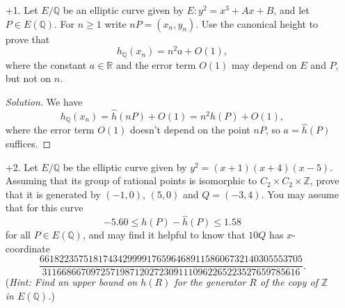 \documentclass[a4paper]{article}
\theoremstyle{plain}
\theoremstyle{remark}
\theoremstyle{definition}
\newcommand{\Z}{\mathbb{Z}}
\newcommand{\Q}{\mathbb{Q}}
\newcommand{\R}{\mathbb{R}}
\begin{document}
\begin{enumerate}
    \item[+1.] Let $E/\Q$ be an elliptic curve given by $E:y^2=x^3+Ax+B$, and
        let $P\in E(\Q)$. For $n\ge1$ write $nP=(x_n,y_n)$. Use the canonical
        height to prove that
        \begin{equation*}
            h_\Q(x_n) = n^2a+O(1),
        \end{equation*}
        where the constant $a\in\R$ and the error term $O(1)$ may depend on $E$
        and $P$, but not on $n$.

        \begin{proof}[Solution]
            We have
            \begin{equation*}
                h_\Q(x_n)
                    = \hat h(nP) + O(1)
                    = n^2\hat h(P) + O(1),
            \end{equation*}
            where the error term $O(1)$ doesn't depend on the point $nP$, so
            $a=\hat h(P)$ suffices.
        \end{proof}

    \item[+2.] Let $E/\Q$ be the elliptic curve given by $y^2=(x+1)(x+4)(x-5)$.
        Assuming that its group of rational points is isomorphic to
        $C_2\times C_2\times\Z$, prove that it is generated by $(-1,0)$, $(5,0)$
        and $Q=(-3,4)$. You may assume that for this curve
        \begin{equation*}
            -5.60 \le h(P) - \hat h(P) \le 1.58
        \end{equation*}
        for all $P\in E(\Q)$, and may find it helpful to know that $10Q$ has
        $x$-coordinate
        \begin{equation*}
            \frac{661822357518174342999917659646891158606732140305553705}
                {31166866709725719871202723091110962265223527659785616}.
        \end{equation*}
        (\textit{Hint: Find an upper bound on $h(R)$ for the generator $R$ of
        the copy of $\Z$ in $E(\Q)$.})


\end{enumerate}
\end{document}
